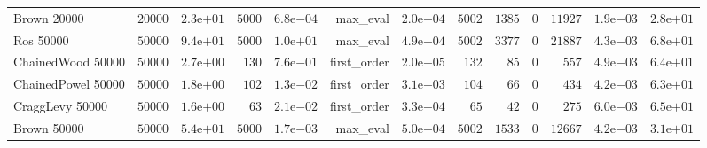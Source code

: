 \begin{longtable}[c]{lrrrrrrrrrrrr}
Brown 20000 & \(20000\) & \( 2.3\)e\(+01\) & \( 5000\) & \( 6.8\)e\(-04\) & max\_eval & \( 2.0\)e\(+04\) & \( 5002\) & \( 1385\) & \(    0\) & \(11927\) & \( 1.9\)e\(-03\) & \( 2.8\)e\(+01\) \\
Ros 50000 & \(50000\) & \( 9.4\)e\(+01\) & \( 5000\) & \( 1.0\)e\(+01\) & max\_eval & \( 4.9\)e\(+04\) & \( 5002\) & \( 3377\) & \(    0\) & \(21887\) & \( 4.3\)e\(-03\) & \( 6.8\)e\(+01\) \\
ChainedWood 50000 & \(50000\) & \( 2.7\)e\(+00\) & \(  130\) & \( 7.6\)e\(-01\) & first\_order & \( 2.0\)e\(+05\) & \(  132\) & \(   85\) & \(    0\) & \(  557\) & \( 4.9\)e\(-03\) & \( 6.4\)e\(+01\) \\
ChainedPowel 50000 & \(50000\) & \( 1.8\)e\(+00\) & \(  102\) & \( 1.3\)e\(-02\) & first\_order & \( 3.1\)e\(-03\) & \(  104\) & \(   66\) & \(    0\) & \(  434\) & \( 4.2\)e\(-03\) & \( 6.3\)e\(+01\) \\
CraggLevy 50000 & \(50000\) & \( 1.6\)e\(+00\) & \(   63\) & \( 2.1\)e\(-02\) & first\_order & \( 3.3\)e\(+04\) & \(   65\) & \(   42\) & \(    0\) & \(  275\) & \( 6.0\)e\(-03\) & \( 6.5\)e\(+01\) \\
Brown 50000 & \(50000\) & \( 5.4\)e\(+01\) & \( 5000\) & \( 1.7\)e\(-03\) & max\_eval & \( 5.0\)e\(+04\) & \( 5002\) & \( 1533\) & \(    0\) & \(12667\) & \( 4.2\)e\(-03\) & \( 3.1\)e\(+01\) \\
\hline 
\end{longtable}




